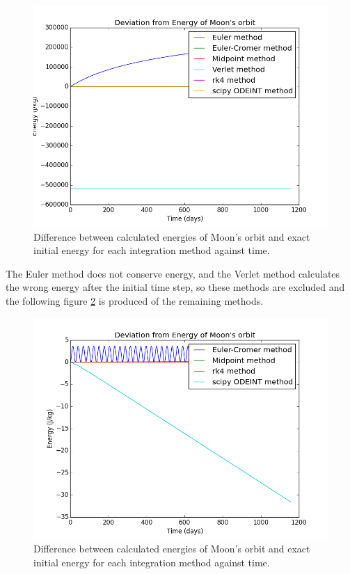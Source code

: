 \documentclass[10pt,letterpaper]{article}
\begin{document}
\begin{figure}[!htb]
\centering
\includegraphics[scale=0.6]{figures/test_cases/Energy_conservation_all_methods.png}
\caption{Difference between calculated energies of Moon's orbit and exact initial energy for each integration method against time.}\label{fig:Energy_conservation_all_methods}
\end{figure}

The Euler method does not conserve energy, and the Verlet method calculates the wrong energy after the initial time step, so these methods are excluded and the following figure \ref{fig:Energy_conservation_good_methods} is produced of the remaining methods.\\

\begin{figure}[!htb]
\centering
\includegraphics[scale=0.6]{figures/test_cases/Energy_conservation_good_methods.png}
\caption{Difference between calculated energies of Moon's orbit and exact initial energy for each integration method against time.}\label{fig:Energy_conservation_good_methods}
\end{figure}
\end{document}
